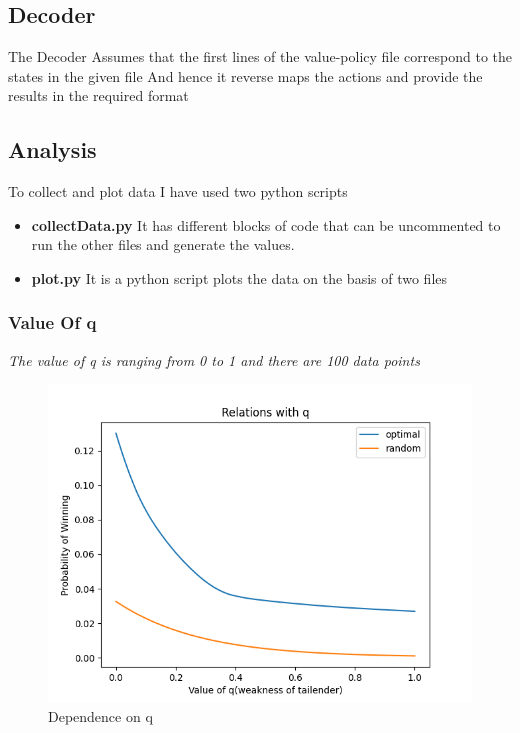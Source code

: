 \documentclass[10pt]{article}
\begin{document}
\subsection{Decoder}
The Decoder Assumes that the first lines of the value-policy file correspond to the states in the given file 
And hence it reverse maps the actions and provide the results in the required format

\subsection{Analysis}

To collect and plot data I have used two python scripts
\begin{itemize}
    \item \textbf{collectData.py} It has different blocks of code that can be uncommented to run the other files and generate the values.
    \item \textbf{plot.py} It is a python script plots the data on the basis of two files 
\end{itemize}

\subsubsection{Value Of q}
\textit{The value of q is ranging from 0 to 1 and there are 100 data points}
\begin{figure}[H]
    \centering
    \includegraphics[scale = 0.9 ]{../Figure_1.png}
    \caption{Dependence on q}
\end{figure}
\end{document}
